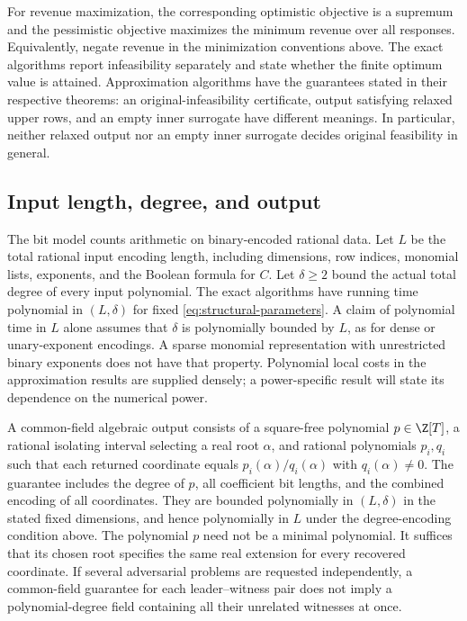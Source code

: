 For revenue maximization, the corresponding optimistic objective is a
supremum and the pessimistic objective maximizes the minimum revenue over
all responses. Equivalently, negate revenue in the minimization
conventions above. The exact algorithms report infeasibility separately
and state whether the finite optimum value is attained. Approximation
algorithms have the guarantees stated in their respective theorems:
an original-infeasibility certificate, output satisfying relaxed upper
rows, and an empty inner surrogate have different meanings. In particular,
neither relaxed output nor an empty inner surrogate decides original
feasibility in general.

\subsection{Input length, degree, and output}\label{subsec:encoding}

The bit model counts arithmetic on binary-encoded rational data. Let $L$
be the total rational input encoding length, including dimensions, row
indices, monomial lists, exponents, and the Boolean formula for $C$.
Let $\delta\ge2$ bound the actual total degree of every input polynomial.
The exact algorithms have running time polynomial in $(L,\delta)$ for
fixed \eqref{eq:structural-parameters}. A claim of polynomial time in $L$
alone assumes that $\delta$ is polynomially bounded by $L$, as for dense
or unary-exponent encodings. A sparse monomial representation with
unrestricted binary exponents does not have that property. Polynomial
local costs in the approximation results are supplied densely; a
power-specific result will state its dependence on the numerical power.

A common-field algebraic output consists of a square-free polynomial
$p\in\Z[T]$, a rational isolating interval selecting a real root
$\alpha$, and rational polynomials $p_i,q_i$ such that each returned
coordinate equals $p_i(\alpha)/q_i(\alpha)$ with $q_i(\alpha)\ne0$.
The guarantee includes the degree of $p$, all coefficient bit lengths,
and the combined encoding of all coordinates. They are bounded
polynomially in $(L,\delta)$ in the stated fixed dimensions, and hence
polynomially in $L$ under the degree-encoding condition above. The
polynomial $p$ need not be a minimal polynomial. It suffices that its
chosen root specifies the same real extension for every recovered
coordinate. If several adversarial problems are requested independently,
a common-field guarantee for each leader--witness pair does not imply a
polynomial-degree field containing all their unrelated witnesses at once.

